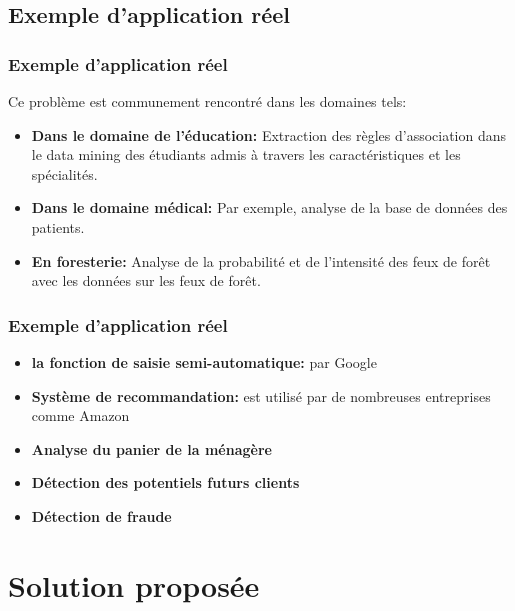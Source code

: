 \documentclass{beamer}
\begin{document}
\subsection[Exemple d'application réel]{Exemple d'application réel}
\frame
{
  \frametitle{Exemple d'application réel}
Ce problème est communement rencontré dans les domaines tels:
  \begin{itemize}
  \item<1-> \textbf{Dans le domaine de l'éducation: }Extraction des règles d'association dans le data mining des étudiants admis à travers les caractéristiques et les spécialités.  
  \item<1-> \textbf{Dans le domaine médical:} Par exemple, analyse de la base de données des patients.
   \item<1-> \textbf{En foresterie:} Analyse de la probabilité et de l'intensité des feux de forêt avec les données sur les feux de forêt.
   \end{itemize}
 }
 
 \frame
 {
  \frametitle{Exemple d'application réel}
  \begin{itemize}
  \item<1-> \textbf{la fonction de saisie semi-automatique:} par Google
   \item<1-> \textbf{Système de recommandation:} est utilisé par de nombreuses entreprises comme Amazon
   \item<1-> \textbf{Analyse du panier de la ménagère}
   \item<1-> \textbf{Détection des potentiels futurs clients}
   \item<1-> \textbf{Détection de fraude}
  \end{itemize}
}


\section[Solution proposée]{Solution proposée}
\end{document}
